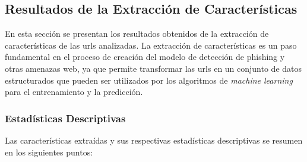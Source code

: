 \subsection{Resultados de la Extracción de Características}

En esta sección se presentan los resultados obtenidos de la extracción de características de las \glspl{url} analizadas. La extracción de características es un paso fundamental en el proceso de creación del modelo de detección de \gls{phishing} y otras amenazas web, ya que permite transformar las \glspl{url} en un conjunto de datos estructurados que pueden ser utilizados por los algoritmos de \textit{machine learning} para el entrenamiento y la predicción.

\subsubsection*{Estadísticas Descriptivas}

Las características extraídas y sus respectivas estadísticas descriptivas se resumen en los siguientes puntos:

